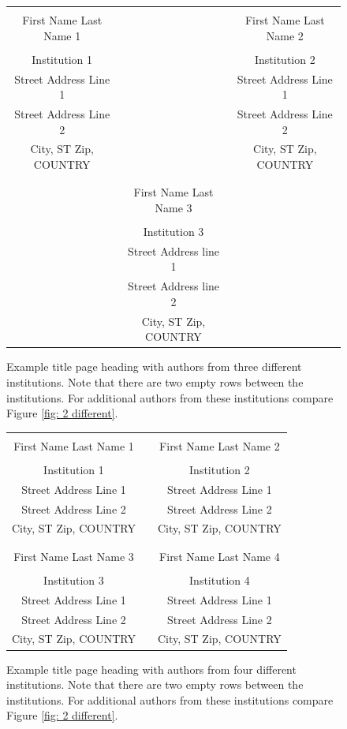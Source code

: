\documentclass{article}
\begin{document}
\begin{figure}[htb]
{
\centering
\begin{tabular}{ccc}
\phantom{This adjusts spacing - ignore} & \phantom{This adjusts spacing - ignore} & \phantom{This adjusts spacing - ignore} \\
First Name Last Name 1 & & First Name Last Name 2 \\
\\
Institution 1 & & Institution 2 \\
Street Address Line 1 & & Street Address Line 1 \\
Street Address Line 2 & & Street Address Line 2 \\
City, ST Zip, COUNTRY & & City, ST Zip, COUNTRY \\
\\
\\
& First Name Last Name 3 \\
\\
& Institution 3\\
& Street Address line 1 \\
& Street Address line 2 \\
& City, ST Zip, COUNTRY
\end{tabular}
\caption{Example title page heading with authors from three different institutions. Note that there are two empty rows between the institutions. For additional authors from these institutions compare Figure \ref{fig: 2 different}. \label{fig: 3 different}}
}
\end{figure}

\begin{figure}[htb]
{
\centering
\begin{tabular}{ccc}
\phantom{Adjust spacing using these entries} & \phantom{intermediate space} & \phantom{Adjust spacing using these entries} \\
First Name Last Name 1 & & First Name Last Name 2 \\
\\
Institution 1 & & Institution 2 \\
Street Address Line 1 & & Street Address Line 1 \\
Street Address Line 2 & & Street Address Line 2 \\
City, ST Zip, COUNTRY & & City, ST Zip, COUNTRY \\
\\ \\
First Name Last Name 3 & & First Name Last Name 4 \\
\\
Institution 3 & & Institution 4 \\
Street Address Line 1 & & Street Address Line 1 \\
Street Address Line 2 & & Street Address Line 2 \\
City, ST Zip, COUNTRY & & City, ST Zip, COUNTRY
\end{tabular}
\caption{Example title page heading with authors from four different institutions. Note that there are two empty rows between the institutions. For additional authors from these institutions compare Figure \ref{fig: 2 different}. \label{fig: 4 different}}
}
\end{figure}
\end{document}
